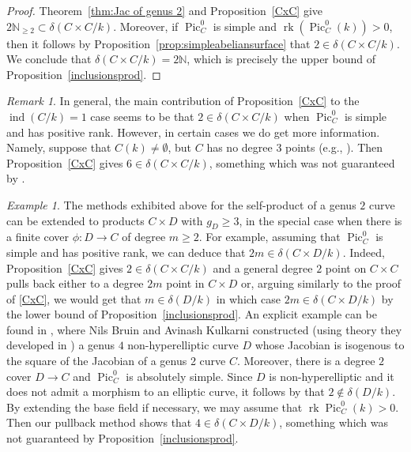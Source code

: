\documentclass[a4paper,11pt]{amsart}
\theoremstyle{plain}
\theoremstyle{remark}
\newtheorem{remark}[thm]{Remark}
\newtheorem{example}[thm]{Example}
\newcommand{\nn}{\mathbb{N}}
\newcommand{\Pic}{\operatorname{Pic}}
\newcommand{\rk}{\operatorname{rk}}
\newcommand{\dendegs}{\delta}
\newcommand{\ind}{\operatorname{ind}}
\begin{document}
\begin{proof}
    Theorem~\ref{thm:Jac of genus 2} and Proposition~\ref{CxC} give $2\nn_{\geq 2}\subset\dendegs(C\times C/k)$.  
    Moreover, if $\Pic^0_C$ is simple and $\rk(\Pic^0_C(k))>0$, then it follows by Proposition~\ref{prop:simpleabeliansurface} that $2\in\dendegs(C\times C/k)$. 
We conclude that $\dendegs(C\times C/k)=2\nn$, which is precisely the upper bound of Proposition~\ref{inclusionsprod}. 
\end{proof}


\begin{remark} 
In general, the main contribution of Proposition~\ref{CxC} to the $\ind(C/k)=1$ case seems to be that $2\in\dendegs(C\times C/k)$ when $\Pic_C^0$ is simple and has positive rank.
However, in certain cases we do get more information. 
Namely, suppose that $C(k)\neq\emptyset$, but $C$ has no degree $3$ points (e.g., \cite[Example 5.1.3]{VV}). 
Then Proposition~\ref{CxC} gives $6\in\dendegs(C\times C/k)$, something which was not guaranteed by . 
\end{remark}



\begin{example}
    The methods exhibited above for the self-product of a genus $2$ curve can be extended to products $C\times D$ with $g_D\geq 3$, in the special case when there is a finite cover $\phi: D\xrightarrow{}C$ of degree $m\geq 2$. For example, assuming that $\Pic_C^0$ is simple and has positive rank, we can deduce that $2m\in\dendegs(C\times D/k)$. 
    Indeed, Proposition~\ref{CxC} gives $2\in\dendegs(C\times C/k)$ and a general degree $2$ point on $C\times C$ pulls back either to a degree $2m$ point in $C\times D$ or, arguing similarly to the proof of \ref{CxC}, we would get that $m\in\dendegs(D/k)$
    in which case $2m\in\dendegs(C\times D/k)$ by the lower bound of Proposition~\ref{inclusionsprod}. 
    An explicit example can be found in \cite[Example 7.1]{bruin202322decomposablegenus4jacobians}, where  Nils Bruin and Avinash Kulkarni constructed (using theory they developed in \cite[Theorem 1.1, Proposition 4.4]{bruin202322decomposablegenus4jacobians}) a genus $4$ non-hyperelliptic curve $D$ whose Jacobian is isogenous to the square of the Jacobian of a genus 2 curve $C$. Moreover, there is a degree $2$ cover $D\to C$ and $\Pic^0_C$ is absolutely simple. Since $D$ is non-hyperelliptic and it does not admit a morphism to an elliptic curve, it follows by \cite[Lemma 3.2]{VogtKadets2024} that $2\not\in\dendegs(D/k)$. By extending the base field if necessary, we may assume that $\rk\Pic_C^0(k)>0$. Then our pullback method shows that $4\in\dendegs(C\times D/k)$, something which was not guaranteed by Proposition~\ref{inclusionsprod}.
\end{example}
\end{document}
